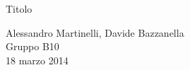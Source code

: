\begin{center}

     	{\huge Titolo}

     	\vspace{0.2cm}
	\vspace{0.3cm}

      	{\large Alessandro Martinelli, Davide Bazzanella} \\
		{ Gruppo B10} \\
	
	\vspace{0.1cm}
      	{ 18 marzo 2014}

\end{center}
